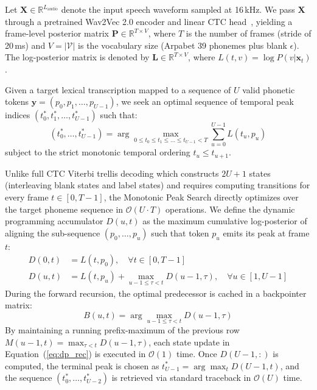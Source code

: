 \documentclass[10pt,conference]{IEEEtran}
\begin{document}
Let $\mathbf{X} \in \mathbb{R}^{L_{\text{audio}}}$ denote the input speech waveform sampled at 16\,kHz. We pass $\mathbf{X}$ through a pretrained Wav2Vec 2.0 encoder and linear CTC head~\cite{baevski2020wav2vec}, yielding a frame-level posterior matrix $\mathbf{P} \in \mathbb{R}^{T \times V}$, where $T$ is the number of frames (stride of 20\,ms) and $V = |\mathcal{V}|$ is the vocabulary size (Arpabet 39 phonemes plus blank $\epsilon$). The log-posterior matrix is denoted by $\mathbf{L} \in \mathbb{R}^{T \times V}$, where $L(t, v) = \log P(v | \mathbf{x}_t)$.

Given a target lexical transcription mapped to a sequence of $U$ valid phonetic tokens $\mathbf{y} = (p_0, p_1, \dots, p_{U-1})$, we seek an optimal sequence of temporal peak indices $(t_0^*, t_1^*, \dots, t_{U-1}^*)$ such that:
\begin{equation}
(t_0^*, \dots, t_{U-1}^*) = \arg\max_{0 \le t_0 \le t_1 \le \dots \le t_{U-1} < T} \sum_{u=0}^{U-1} L(t_u, p_u)
\label{eq:peak_objective}
\end{equation}
subject to the strict monotonic temporal ordering $t_u \le t_{u+1}$.

Unlike full CTC Viterbi trellis decoding which constructs $2U+1$ states (interleaving blank states and label states) and requires computing transitions for every frame $t \in [0, T-1]$, the Monotonic Peak Search directly optimizes over the target phoneme sequence in $\mathcal{O}(U \cdot T)$ operations. We define the dynamic programming accumulator $D(u, t)$ as the maximum cumulative log-posterior of aligning the sub-sequence $(p_0, \dots, p_u)$ such that token $p_u$ emits its peak at frame $t$:
\begin{align}
D(0, t) &= L(t, p_0), \quad \forall t \in [0, T-1] \label{eq:dp_init} \\
D(u, t) &= L(t, p_u) + \max_{u-1 \le \tau < t} D(u-1, \tau), \quad \forall u \in [1, U-1]
\label{eq:dp_rec}
\end{align}
During the forward recursion, the optimal predecessor is cached in a backpointer matrix:
\begin{equation}
B(u, t) = \arg\max_{u-1 \le \tau < t} D(u-1, \tau)
\label{eq:backpointer}
\end{equation}
By maintaining a running prefix-maximum of the previous row $M(u-1, t) = \max_{\tau < t} D(u-1, \tau)$, each state update in Equation~(\ref{eq:dp_rec}) is executed in $\mathcal{O}(1)$ time. Once $D(U-1, :)$ is computed, the terminal peak is chosen as $t_{U-1}^* = \arg\max_t D(U-1, t)$, and the sequence $(t_0^*, \dots, t_{U-2}^*)$ is retrieved via standard traceback in $\mathcal{O}(U)$ time.
\end{document}
